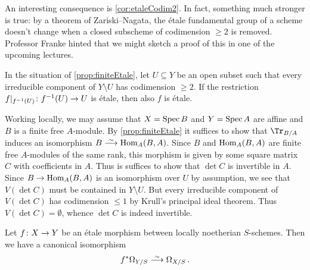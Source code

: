 \documentclass[a4paper, 10pt, oneside, DIV=9, chapterprefix=true, numbers=enddot, bibliography=totoc]{scrbook}
\begin{document}
An interesting consequence is \cref{cor:etaleCodim2}. In fact, something much stronger is true: by a theorem of Zariski--Nagata, the étale fundamental group of a scheme doesn't change when a closed subscheme of codimension $\geq2$ is removed. Professor Franke hinted that we might sketch a proof of this in one of the upcoming lectures.
\begin{cor}\label{cor:etaleCodim2}
	In the situation of \cref{prop:finiteEtale}, let $U\subseteq Y$ be an open subset such that every irreducible component of $Y\setminus U$ has codimension $\geq 2$. If the restriction $f|_{f^{-1}(U)}\colon f^{-1}(U)\morphism U$ is étale, then also $f$ is étale.
\end{cor}
\begin{proof*}
	Working locally, we may assume that $X=\operatorname{Spec} B$ and $Y=\operatorname{Spec} A$ are affine and $B$ is a finite free $A$-module. By \cref{prop:finiteEtale} it suffices to show that $\Tr_{B/A}$ induces an isomorphism $B\isomorphism \Hom_A(B,A)$. Since $B$ and $\operatorname{Hom}_A(B,A)$ are finite free $A$-modules of the same rank, this morphism is given by some square matrix $C$ with coefficients in $A$. Thus is suffices to show that $\det C$ is invertible in $A$. Since $B\morphism\Hom_A(B,A)$ is an isomorphism over $U$ by assumption, we see that $V(\det C)$ must be contained in $Y\setminus U$. But every irreducible component of $V(\det C)$ has codimension $\leq 1$ by Krull's principal ideal theorem. Thus $V(\det C)=\emptyset$, whence $\det C$ is indeed invertible.
\end{proof*}
\begin{prop}
	Let $f\colon X\morphism Y$ be an étale morphism between locally noetherian $S$-schemes. Then we have a canonical isomorphism
	\begin{align*}
		f^*\Omega_{Y/S}\isomorphism \Omega_{X/S}\,.
	\end{align*}
\end{prop}
\end{document}
